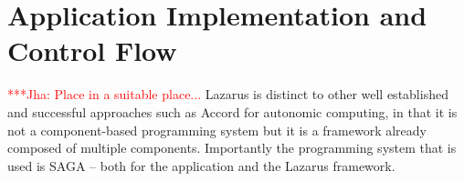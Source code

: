 \documentclass[conference,final]{IEEEtran}
\newcommand{\yaakoub}[0]{}
\newcommand{\jhanote}[1]{ {\textcolor{red} { ***Jha: #1 }}}
\begin{document}




\section{Application Implementation and Control Flow} 

\jhanote{Place in a suitable place...}  Lazarus is distinct to other
well established and successful approaches such as Accord for
autonomic computing, in that it is not a component-based programming
system but it is a framework already composed of multiple
components. Importantly the programming system that is used is SAGA --
both for the application and the Lazarus framework.
\end{document}
